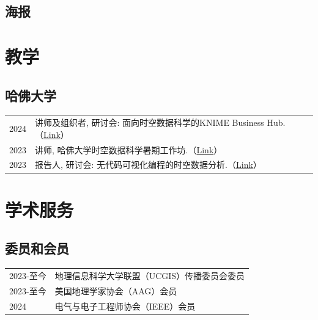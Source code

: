 \documentclass[11pt]{article}
\begin{document}
\subsection*{海报}
\label{posters}
\newrefcontext[labelprefix=P]
\printbibliography[type=misc,heading=none,resetnumbers=true,keyword=P]

\section*{教学}
\label{teaching}

\subsection*{哈佛大学}

\begin{longtable}[l]{@{}p{} p{}}

	2024 & 讲师及组织者, 研讨会: 面向时空数据科学的KNIME Business Hub.（\href{https://gis.harvard.edu/event/workshop-web-based-workflows-reproducible-and-shareable-spatiotemporal-data-analysis}{Link}） \\
	2023 & 讲师, 哈佛大学时空数据科学暑期工作坊.（\href{https://sdl.gis.harvard.edu/event/summer-workshop-spatiotemporal-innovation-0}{Link}）                                                           \\
	2023 & 报告人, 研讨会: 无代码可视化编程的时空数据分析.（\href{https://gis.harvard.edu/event/spatiotemporal-data-analysis-codeless-visual-programming}{Link}）                                            \\
\end{longtable}

\section*{学术服务}
\label{service}

\subsection*{委员和会员}

\begin{longtable}[l]{@{}p{} p{}}

	2023-至今 & 地理信息科学大学联盟（UCGIS）传播委员会委员 \\
	2023-至今 & 美国地理学家协会（AAG）会员          \\
	2024    & 电气与电子工程师协会（IEEE）会员       \\
\end{longtable}
\end{document}
